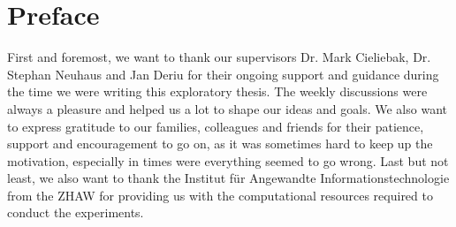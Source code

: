 \chapter*{Preface}
First and foremost, we want to thank our supervisors Dr. Mark Cieliebak, Dr. Stephan Neuhaus and Jan Deriu for their ongoing support and guidance during the time we were writing this exploratory thesis. The weekly discussions were always a pleasure and helped us a lot to shape our ideas and goals. We also want to express gratitude to our families, colleagues and friends for their patience, support and encouragement to go on, as it was sometimes hard to keep up the motivation, especially in times were everything seemed to go wrong. Last but not least, we also want to thank the Institut für Angewandte Informationstechnologie from the ZHAW for providing us with the computational resources required to conduct the experiments.
